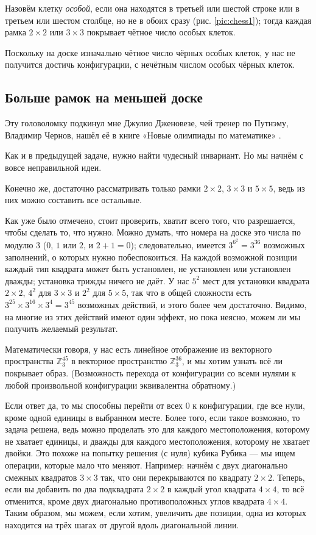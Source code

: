Назовём клетку \emph{особой}, если она находятся в третьей или шестой строке или в третьем или шестом столбце, но не в обоих сразу (рис. \ref{pic:chess1}); тогда каждая рамка $2 \times 2$ или $3 \times 3$ покрывает чётное число особых клеток.

Поскольку на доске изначально чётное число чёрных особых клеток, у нас не получится достичь конфигурации, с нечётным  числом особых чёрных клеток.

\subsection*{Больше рамок на меньшей доске}

Эту головоломку подкинул мне Джулио Дженовезе, чей тренер по Путнэму, Владимир Чернов, нашёл её в книге «Новые олимпиады по математике» \cite{markova}.

Как и в предыдущей задаче, нужно найти чудесный инвариант.
Но мы начнём с вовсе неправильной идеи.

Конечно же, достаточно рассматривать только рамки $2 \times 2$, $3 \times 3$ и $5 \times 5$, ведь из них можно составить все остальные.

Как уже было отмечено, стоит проверить, хватит всего того, что разрешается, чтобы сделать то, что нужно.
Можно думать, что номера на доске это числа по модулю $3$ ($0$, $1$ или $2$, и $2 + 1 = 0$); следовательно, имеется $3^{6^2} = 3^{36}$ возможных заполнений, о которых нужно побеспокоиться.
На каждой возможной позиции каждый тип квадрата может быть установлен, не установлен или установлен дважды; установка трижды ничего не даёт.
У нас $5^2$ мест для установки квадрата $2 \times 2$,
$4^2$ для $3 \times 3$
и $2^2$ для $5 \times 5$, так что в общей сложности есть $3^{25} \times 3^{16} \times 3^4 = 3^{45}$ возможных действий, и этого более чем достаточно.
Видимо, на многие из этих действий имеют один эффект, но пока неясно, можем ли мы получить желаемый результат.

Математически говоря, у нас есть линейное отображение из векторного пространства $\mathbb{Z}_3^{45}$ в векторное пространство $\mathbb{Z}_3^{36}$, и мы хотим узнать всё ли покрывает образ.
(Возможность перехода от конфигурации со всеми нулями к любой произвольной конфигурации эквивалентна обратному.)

Если ответ да, то мы способны перейти от всех $0$ к конфигурации, где все нули, кроме одной единицы в выбранном месте.
Более того, если такое возможно, то задача решена, ведь можно проделать это для каждого местоположения, которому не хватает единицы, и дважды для каждого местоположения, которому не хватает двойки.
Это похоже на попытку решения (с нуля) кубика Рубика --- мы ищем операции, которые мало что меняют.
Например: начнём с двух диагонально смежных квадратов $3 \times 3$ так, что они перекрываются по квадрату $2 \times 2$.
Теперь, если вы добавить по два подквадрата $2 \times 2$ в каждый угол квадрата $4 \times 4$, то всё отменится, кроме двух диагонально противоположных углов квадрата $4 \times 4$.
Таким образом, мы можем, если хотим, увеличить две позиции, одна из которых находится на трёх шагах от другой вдоль диагональной линии.

